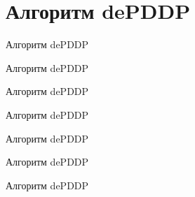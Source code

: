 \documentclass[aspectratio=169,tikz]{beamer}
\newcommand{\dePDDP}{dePDDP\xspace}
\begin{document}
	\section{Алгоритм \dePDDP}
	
	\begin{frame}{Алгоритм \dePDDP}
		\begin{figure} %
			\centering
			
		\end{figure}
	\end{frame}
	
	\begin{frame}{Алгоритм \dePDDP}
		\begin{figure} %
			\centering
			
		\end{figure}
	\end{frame}
	
	\begin{frame}{Алгоритм \dePDDP}
		\begin{figure} %
			\centering
			
		\end{figure}
	\end{frame}	

	\begin{frame}{Алгоритм \dePDDP}
		\begin{figure} %
			\centering
			
		\end{figure}
	\end{frame}	
	
	\begin{frame}{Алгоритм \dePDDP}
		\begin{figure} %
			\centering
			
		\end{figure}
	\end{frame}	
	

	\begin{frame}{Алгоритм \dePDDP}
		\begin{figure} %
			\centering
			
		\end{figure}
	\end{frame}	
	
	
	\begin{frame}{Алгоритм \dePDDP}
		\begin{figure} %
			\centering
			
		\end{figure}
	\end{frame}	
\end{document}
